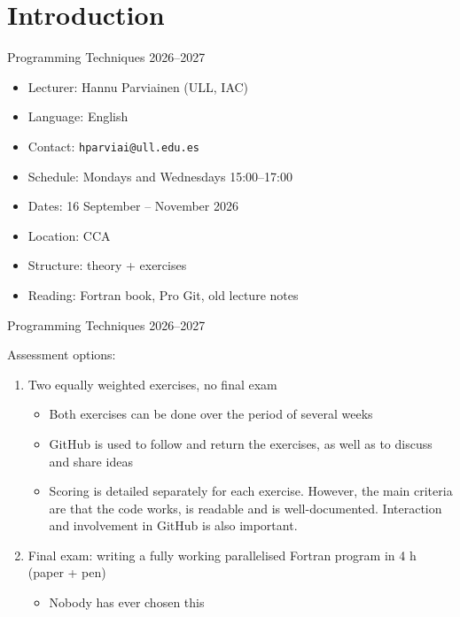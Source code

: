 
\subtitle{Lecture 1: Introduction and Version Control}



\begin{frame}
  \titlepage
\end{frame}

\section{Introduction}

\begin{frame}{Programming Techniques 2026--2027}
  \begin{itemize}
    \item Lecturer: Hannu Parviainen (ULL, IAC)
    \item Language: English
    \item Contact: \texttt{hparviai@ull.edu.es}
    \item Schedule: Mondays and Wednesdays 15:00--17:00
    \item Dates: 16 September -- November 2026
    \item Location: CCA
    \item Structure: theory + exercises
    \item Reading: Fortran book, Pro Git, old lecture notes
  \end{itemize}
\end{frame}

\begin{frame}{Programming Techniques 2026--2027}
	\begin{block}{Assessment options:}
		\begin{enumerate}
			\item Two equally weighted exercises, no final exam
			\begin{itemize}
				\item Both exercises can be done over the period of several weeks
				\item GitHub is used to follow and return the exercises, as well as to discuss and share ideas
				\item Scoring is detailed separately for each exercise. However, the main criteria are that the code works, is readable and is well-documented. Interaction and involvement in GitHub is also important.
			\end{itemize}
			\vspace{0.25cm}
			\item Final exam: writing a fully working parallelised Fortran program in 4 h (paper + pen)
			\begin{itemize}
				\item Nobody has ever chosen this
			\end{itemize}
		\end{enumerate}
	\end{block}
\end{frame}


